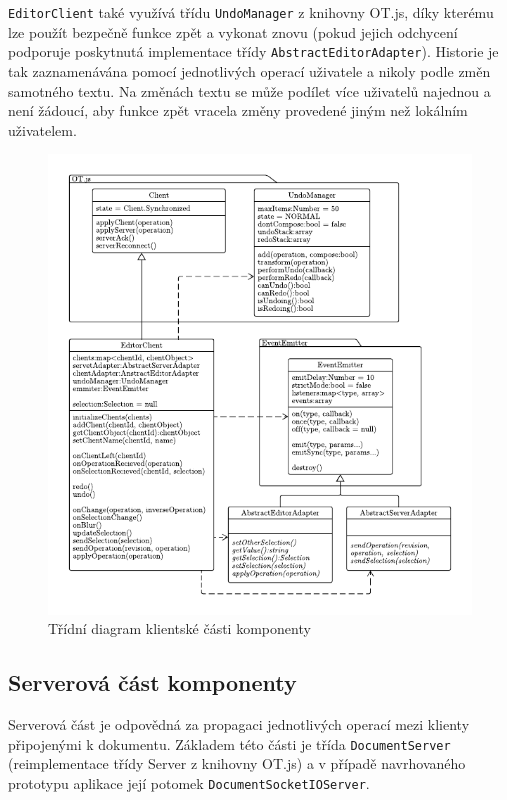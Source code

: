 \texttt{EditorClient} také využívá třídu \texttt{UndoManager} z knihovny OT.js, díky kterému lze použít bezpečně funkce zpět a vykonat znovu (pokud jejich odchycení podporuje poskytnutá implementace třídy \texttt{AbstractEditorAdapter}).
Historie je tak zaznamenávána pomocí jednotlivých operací uživatele a nikoly podle změn samotného textu.
Na změnách textu se může podílet více uživatelů najednou a není žádoucí, aby funkce zpět vracela změny provedené jiným než lokálním uživatelem.

\begin{figure}[ht!]
    \centering
    \includegraphics[width=\textwidth]{partials/navrh/EditorClient.pdf}
    \caption{Třídní diagram klientské části komponenty}\label{fig:EditorClient}
\end{figure}

\subsection{Serverová část komponenty}\label{subsec:serverováČást}

Serverová část je odpovědná za propagaci jednotlivých operací mezi klienty připojenými k dokumentu.
Základem této části je třída \texttt{DocumentServer} (reimplementace třídy Server z knihovny OT.js) a v případě navrhovaného prototypu aplikace její potomek \texttt{DocumentSocketIOServer}.

